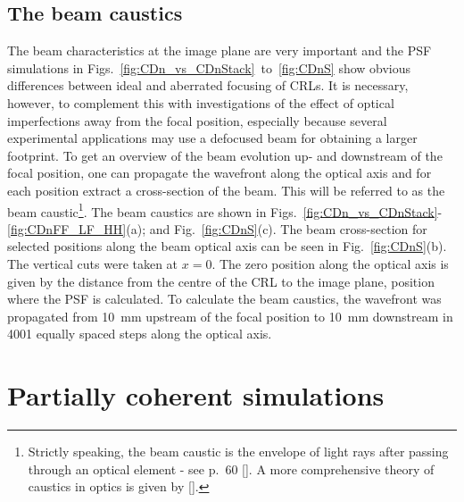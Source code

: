 \begin{refsection}
\subsection{The beam caustics}\label{sec:caustics_sim}

The beam characteristics at the image plane are very important and the PSF simulations in Figs.~\ref{fig:CDn_vs_CDnStack}~to~\ref{fig:CDnS} show obvious differences between ideal and aberrated focusing of CRLs. It is necessary, however, to complement this with investigations of the effect of optical imperfections away from the focal position, especially because several experimental applications may use a defocused beam for obtaining a larger footprint. To get an overview of the beam evolution up- and downstream of the focal position, one can propagate the wavefront along the optical axis and for each position extract a cross-section of the beam. This will be referred to as the beam caustic\footnote{Strictly speaking, the beam caustic is the envelope of light rays after passing through an optical element - see p.~60 [\cite{Lawrence1972}]. A more comprehensive theory of caustics in optics is given by [\cite{Kravstov1999, Nye1999}].}. The beam caustics are shown in Figs.~\ref{fig:CDn_vs_CDnStack}-\ref{fig:CDnFF_LF_HH}(a); and Fig.~\ref{fig:CDnS}(c). The beam cross-section for selected positions along the beam optical axis can be seen in Fig.~\ref{fig:CDnS}(b). The vertical cuts were taken at $x=0$. The zero position along the optical axis is given by the distance from the centre of the CRL to the image plane, position where the PSF is calculated. To calculate the beam caustics, the wavefront was propagated from 10~mm upstream of the focal position to 10~mm downstream in 4001 equally spaced steps along the optical axis.

\section{Partially coherent simulations}\label{sec:partcoherent_sim}


\end{refsection}
